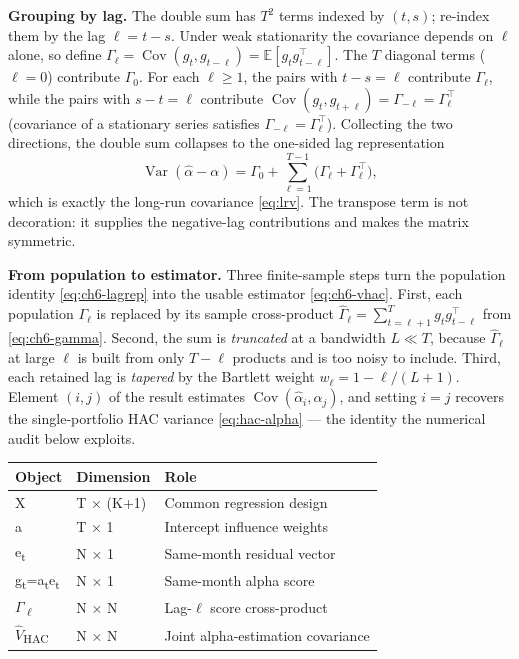 \textbf{Grouping by lag.} The double sum has $T^2$ terms indexed by
$(t,s)$; re-index them by the lag $\ell=t-s$. Under weak stationarity the
covariance depends on $\ell$ alone, so define
$\Gamma_\ell=\operatorname{Cov}(g_t,g_{t-\ell})=\mathbb{E}[g_t g_{t-\ell}^{\top}]$.
The $T$ diagonal terms ($\ell=0$) contribute $\Gamma_0$. For each
$\ell\ge1$, the pairs with $t-s=\ell$ contribute $\Gamma_\ell$, while the
pairs with $s-t=\ell$ contribute
$\operatorname{Cov}(g_t,g_{t+\ell})=\Gamma_{-\ell}=\Gamma_\ell^{\top}$
(covariance of a stationary series satisfies $\Gamma_{-\ell}=\Gamma_\ell^{\top}$).
Collecting the two directions, the double sum collapses to the one-sided
lag representation
\begin{equation}\label{eq:ch6-lagrep}
\operatorname{Var}(\hat\alpha-\alpha)
= \Gamma_0 + \sum_{\ell=1}^{T-1}\bigl(\Gamma_\ell+\Gamma_\ell^{\top}\bigr),
\end{equation}
which is exactly the long-run covariance \eqref{eq:lrv}. The transpose term
is not decoration: it supplies the negative-lag contributions and makes the
matrix symmetric.

\textbf{From population to estimator.} Three finite-sample steps turn the
population identity \eqref{eq:ch6-lagrep} into the usable estimator
\eqref{eq:ch6-vhac}. First, each population $\Gamma_\ell$ is replaced by its
sample cross-product $\hat\Gamma_\ell=\sum_{t=\ell+1}^{T} g_t g_{t-\ell}^{\top}$
from \eqref{eq:ch6-gamma}. Second, the sum is \emph{truncated} at a
bandwidth $L\ll T$, because $\hat\Gamma_\ell$ at large $\ell$ is built from
only $T-\ell$ products and is too noisy to include. Third, each retained lag
is \emph{tapered} by the Bartlett weight $w_\ell=1-\ell/(L+1)$. Element
$(i,j)$ of the result estimates
$\operatorname{Cov}(\hat\alpha_i,\hat\alpha_j)$, and setting $i=j$ recovers
the single-portfolio HAC variance \eqref{eq:hac-alpha} --- the identity the
numerical audit below exploits.

\begin{longtable}[]{@{}p{}p{}p{}@{}}
\toprule\noalign{}
Object & Dimension & Role \\
\midrule\noalign{}
\endhead
\bottomrule\noalign{}
\endlastfoot
X & T \ensuremath{\times } (K+1) & Common regression design \\
a & T \ensuremath{\times } 1 & Intercept influence weights \\
e\textsubscript{t} & N \ensuremath{\times } 1 & Same-month residual vector \\
g\textsubscript{t}=a\textsubscript{t}e\textsubscript{t} & N \ensuremath{\times } 1 &
Same-month alpha score \\
\ensuremath{\Gamma }\textsubscript{\ensuremath{\ell }} & N \ensuremath{\times } N & Lag-\ensuremath{\ell } score cross-product \\
\ensuremath{\hat{V}}\textsubscript{HAC} & N \ensuremath{\times } N & Joint alpha-estimation covariance \\
\end{longtable}

